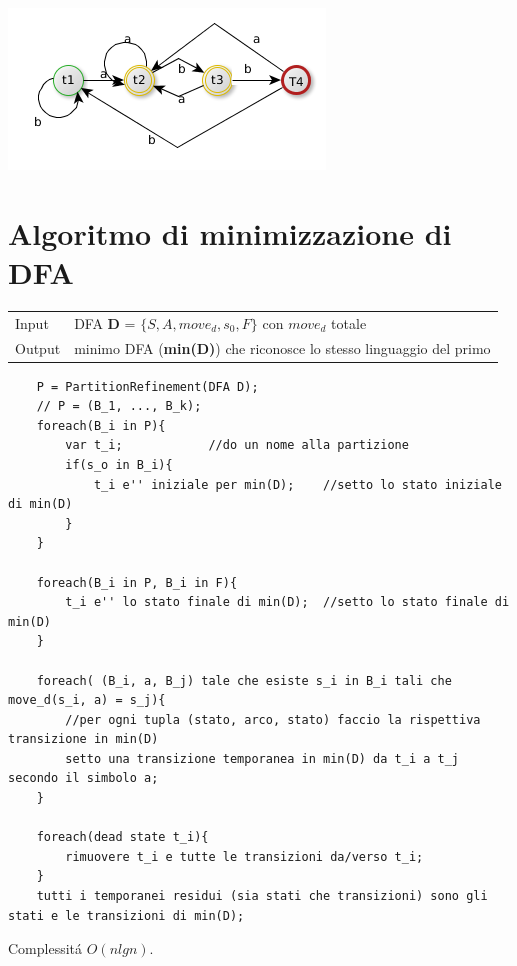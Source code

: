 \begin{center}
	\includegraphics[scale=0.5]{Chapters/Img/c02_06.png}\\
\end{center} 

\section{Algoritmo di minimizzazione di DFA}
\begin{center}
    \begin{tabular}{ll}
        Input   &   DFA \textbf{D} = $\{ S,A,move_d, s_0, F\}$ con $move_d$ totale\\
        Output  &   minimo DFA (\textbf{min(D)}) che riconosce lo stesso linguaggio del primo\\ 
    \end{tabular}
\end{center}

\begin{lstlisting}
    P = PartitionRefinement(DFA D);
    // P = (B_1, ..., B_k);
    foreach(B_i in P){
        var t_i;            //do un nome alla partizione
        if(s_o in B_i){
            t_i e'' iniziale per min(D);    //setto lo stato iniziale di min(D)
        }
    }

    foreach(B_i in P, B_i in F){
        t_i e'' lo stato finale di min(D);  //setto lo stato finale di min(D)
    }

    foreach( (B_i, a, B_j) tale che esiste s_i in B_i tali che move_d(s_i, a) = s_j){
        //per ogni tupla (stato, arco, stato) faccio la rispettiva transizione in min(D)
        setto una transizione temporanea in min(D) da t_i a t_j secondo il simbolo a;
    }

    foreach(dead state t_i){
        rimuovere t_i e tutte le transizioni da/verso t_i;
    }
    tutti i temporanei residui (sia stati che transizioni) sono gli stati e le transizioni di min(D);
\end{lstlisting}
Complessit\'a $O(nlgn)$.

